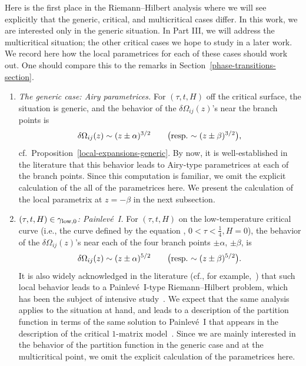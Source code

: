 \documentclass[10pt,a4paper]{amsart}
\numberwithin{equation}{section}
\begin{document}
\begin{Remark} %
Here is the first place in the Riemann--Hilbert analysis where we will see explicitly that the generic, critical, and multicritical cases differ. In this work, we are interested only in the generic situation. In Part III, we will address the multicritical situation; the other critical cases we hope to study in a later work. We record here how the local parametrices for each of these cases should work out. One should compare this to the remarks in Section~\ref{phase-transitions-section}.
 \begin{enumerate}\itemsep=0pt
 \item[$(1)$] \textit{The generic case: Airy parametrices.}
 For $(\tau,t,H)$ off the critical surface, the situation is generic, and the behavior of the $\delta\Omega_{ij}(z)$'s near the branch points is
 \begin{equation*}
 \delta\Omega_{ij}(z) \sim (z\pm \alpha)^{3/2} \qquad \text{\big(resp.\ $\sim (z\pm \beta)^{3/2}$\big)},
 \end{equation*}
 cf.\ Proposition~\ref{local-expansions-generic}. By now, it is well-established in the literature that this behavior leads to Airy-type parametrices at each of the branch points. Since this computation is familiar, we omit the explicit calculation of the all of the parametrices here. We present the calculation of the local parametrix at $z=-\beta$ in the next subsection.


 \item[$(2)$] \textit{$(\tau,t,H)\in \gamma_{{\rm low},0}$: Painlev\'{e}~I.}
 For $(\tau,t,H)$ on the low-temperature critical curve (i.e., the curve defined by the equation , $0<\tau<\frac{1}{4}, H=0$),
 the behavior of the $\delta \Omega_{ij}(z)$'s near each of the four branch points $\pm \alpha$, $\pm \beta$, is
 \begin{equation*}
 \delta \Omega_{ij}(z) \sim (z\pm \alpha)^{5/2} \qquad \text{\big(resp.\ $\sim (z\pm \beta)^{5/2}$\big)}.
 \end{equation*}
 It is also widely acknowledged in the literature (cf., for example,~\cite{DK0}) that such local behavior leads to a Painlev\'{e}~I-type Riemann--Hilbert
 problem, which has been the subject of intensive study~\cite{Kapaev,Kapaev-Kitaev}. We expect that the same analysis applies to the situation at hand,
 and leads to a description of the partition function in terms of the same solution to Painlev\'{e}~I that appears in the description of the critical
 $1$-matrix model~\cite{DK0, FIK1,FIK2}. Since we are mainly interested in the behavior of the partition function in the generic case and at the multicritical point, we omit the explicit calculation of the parametrices here.



\end{enumerate}
\end{Remark}
\end{document}
